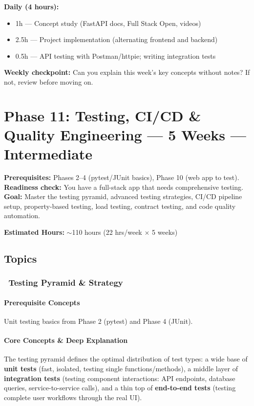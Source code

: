 \documentclass[11pt, a4paper, oneside]{report}
\newcommand{\mustmaster}[1]{\subsubsection{\texorpdfstring{\fcolorbox{blue!40!black}{blue!8}{\footnotesize\bfseries\color{blue!40!black} MUST MASTER}~#1}{#1}}}
\begin{document}
\begin{practicebox}
\textbf{Daily (4 hours):}
\begin{itemize}[leftmargin=*]
\item 1h --- Concept study (FastAPI docs, Full Stack Open, videos)
\item 2.5h --- Project implementation (alternating frontend and backend)
\item 0.5h --- API testing with Postman/httpie; writing integration tests
\end{itemize}


\textbf{Weekly checkpoint:} Can you explain this week's key concepts without notes? If not, review before moving on.
\end{practicebox}

\clearpage
\section[Phase 11: Testing \& CI/CD]{Phase 11: Testing, CI/CD \& Quality Engineering --- 5 Weeks --- Intermediate}

\begin{prereqbox}
\textbf{Prerequisites:} Phases 2--4 (pytest/JUnit basics), Phase 10 (web app to test).\\
\textbf{Readiness check:} You have a full-stack app that needs comprehensive testing.\\
\textbf{Goal:} Master the testing pyramid, advanced testing strategies, CI/CD pipeline setup, property-based testing, load testing, contract testing, and code quality automation.


\textbf{Estimated Hours:} $\sim$110 hours (22 hrs/week $\times$ 5 weeks)
\end{prereqbox}

\subsection*{Topics}

\mustmaster{Testing Pyramid \& Strategy}

\paragraph{Prerequisite Concepts} Unit testing basics from Phase 2 (pytest) and Phase 4 (JUnit).

\paragraph{Core Concepts \& Deep Explanation} The testing pyramid defines the optimal distribution of test types: a wide base of \textbf{unit tests} (fast, isolated, testing single functions/methods), a middle layer of \textbf{integration tests} (testing component interactions: API endpoints, database queries, service-to-service calls), and a thin top of \textbf{end-to-end tests} (testing complete user workflows through the real UI).
\end{document}
